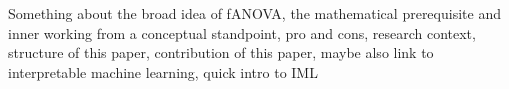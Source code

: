 Something about the broad idea of fANOVA, the mathematical prerequisite and inner working from a conceptual standpoint, pro and cons, research context, structure of this paper, contribution of this paper, maybe also link to interpretable machine learning, quick intro to IML